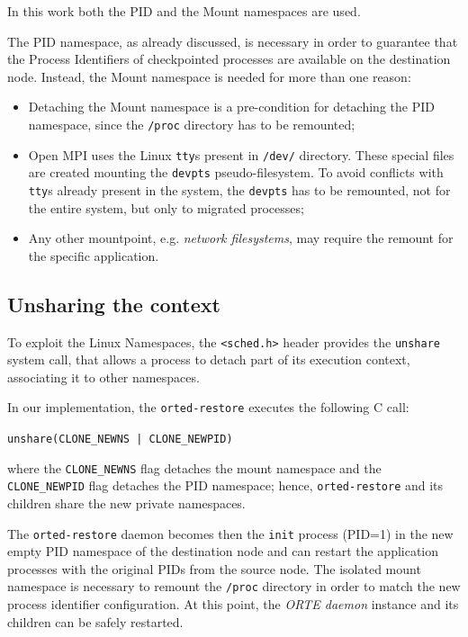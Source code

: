 In this work both the PID and the Mount namespaces are used.

The PID namespace, as already discussed, is necessary in order to guarantee
that the Process Identifiers of checkpointed processes are available on the
destination node. Instead, the Mount namespace is needed for more than one
reason:
\begin{itemize}
\item Detaching the Mount namespace is a pre-condition for detaching the PID
      namespace, since the \texttt{/proc} directory has to be remounted;
\item Open MPI uses the Linux \texttt{tty}s present in
      \texttt{/dev/} directory.
      These special files are created mounting the \texttt{devpts}
      pseudo-filesystem. To avoid conflicts with \texttt{tty}s already
      present in the system, the \texttt{devpts} has to be remounted,
      not for the entire system, but only to migrated processes;
\item Any other mountpoint, e.g. \emph{network filesystems}, may require the remount
      for the specific application.
\end{itemize}

\subsection{Unsharing the context}
To exploit the Linux Namespaces, the \texttt{<sched.h>} header provides the
\texttt{unshare} system call, that allows a process to detach part of its
execution context, associating it to other namespaces.

In our implementation, the \texttt{orted-restore} executes the following C call:

\vspace*{2mm}

\texttt{unshare(CLONE\_NEWNS | CLONE\_NEWPID)}

\vspace*{2mm}
\noindent

where the \texttt{CLONE\_NEWNS} flag detaches the mount namespace and the \linebreak
\texttt{CLONE\_NEWPID} flag detaches the PID namespace; hence,
\texttt{orted-restore} and its children share the new private namespaces.

The \texttt{orted-restore} daemon becomes then the \texttt{init} process
(PID=1)
in the new empty PID namespace of the destination node and can restart the
application processes with the original PIDs from the source node. The isolated
mount namespace is necessary to remount the \texttt{/proc} directory in order
to match the new process identifier configuration. At this point, the
\emph{ORTE daemon} instance and its children can be safely restarted.

